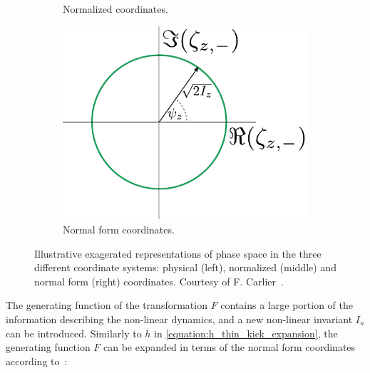 \begin{figure}[!hbt]
\begin{center}
\begin{subfigure}[b]{0.30\textwidth}
\begin{center}
        \caption{Normalized coordinates.}
        \label{fig:phase_space_normalized_non-linear}
        \end{center}
    \end{subfigure}
    \hfill
    \begin{subfigure}[b]{0.3805\textwidth}
        \begin{center}
        \includegraphics[width=\textwidth]{Figures/Beam_Dynamics_Theory/phase_space_nonlinear_normal_form.pdf}
        \caption{Normal form coordinates.}
        \label{fig:phase_space_normal_form_non-linear}
        \end{center}
    \end{subfigure}
    \caption{ Illustrative exagerated representations of phase space in the three different coordinate systems: physical (left), normalized (middle) and normal form (right) coordinates. Courtesy of F. Carlier~\cite{PHD:Carlier}.}
    \label{figure:phase_space_non-linear_physical_normalized_normal_form_coordinates}
    \end{center}
\end{figure}

The generating function of the transformation \(F\) contains a large portion of the information describing the non-linear dynamics, and a new non-linear invariant \(I_u\) can be introduced. 
Similarly to \(h\) in \cref{equation:h_thin_kick_expansion}, the generating function \(F\) can be expanded in terms of the normal form coordinates according to~\cite{PHD:Franchi}:

